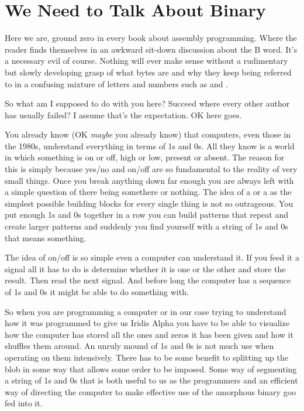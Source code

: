 \chapter{We Need to Talk About Binary} 
\lstset{style=6502Style}

Here we are, ground zero in every book about assembly programming. Where the reader
finds themselves in an awkward sit-down discussion about the B word. It's a necessary evil
of course. Nothing will ever make sense without a rudimentary but slowly developing
grasp of what bytes are and why they keep being referred to in a confusing mixture
of letters and numbers such as  and .

So what am I supposed to do with you here? Succeed where every other author has
usually failed? I assume that's the expectation. OK here goes.

You already know (OK \textit{maybe} you already know) that computers, even those in the 
1980s, understand everything in terms of 1s and 0s. All they know is a world
in which something is on or off, high or low, present or absent. The reason
for this is simply because yes/no and on/off are so fundamental to the reality
of very small things. Once you break anything down far enough you are always
left with a simple question of there being somethere or nothing. The idea of a
 or a  as the simplest possible building blocks for every
single thing is not so outrageous. You put enough 1s and 0s together in a row
you can build patterns that repeat and create larger patterns and suddenly
you find yourself with a string of 1s and 0s that means something.

The idea of on/off is so simple even a computer can understand it. If you feed
it a signal all it has to do is determine whether it is one or the other and
store the result. Then read the next signal. And before long the computer
has a sequence of 1s and 0s it might be able to do something with.

So when you are programming a computer or in our case trying to understand
how it was programmed to give us Iridis Alpha you have to be able to visualize
how the computer has stored all the ones and zeros it has been given and how
it shuffles them around. An unruly mound of 1s and 0s is not much use when
operating on them intensively. There has to be some benefit to splitting
up the blob in some way that allows some order to be imposed. Some way
of segmenting a string of 1s and 0s that is both useful to us as the
programmers and an efficient way of directing the computer to make effective
use of the amorphous binary goo fed into it.

